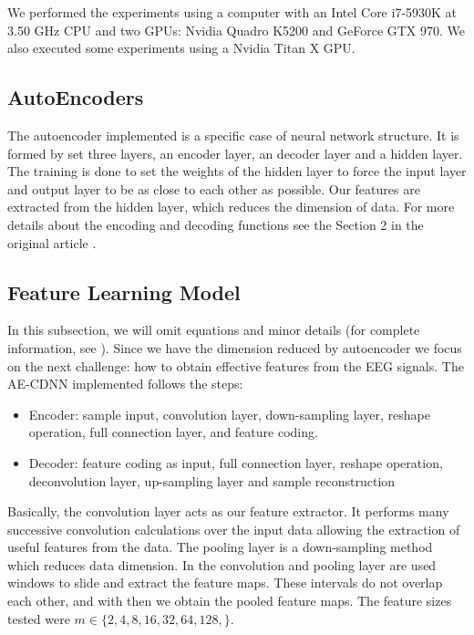 We performed the experiments using a computer with an Intel Core i7-5930K at 3.50 GHz CPU and two GPUs: Nvidia Quadro K5200 and GeForce GTX 970. We also executed some experiments using a Nvidia Titan X GPU.


\subsection{AutoEncoders}

The autoencoder implemented is a specific case of neural network structure. It is formed by set three layers, an encoder layer, an decoder layer and a hidden layer. The training is done to set the weights of the hidden layer to force the input layer and output layer to be as close to each other as possible. Our features are extracted from the hidden layer, which reduces the dimension of data. For more details about the encoding and decoding functions see the Section 2 in the original article \cite{WenZha:2018}.

\subsection{Feature Learning Model}

In this subsection, we will omit equations and minor details (for complete information, see \cite{Shoeb,emami2019autoencoding}). Since we have the dimension reduced by autoencoder we focus on the next challenge: how to obtain effective features from the EEG signals. The AE-CDNN implemented follows the steps:

\begin{itemize}
\item Encoder: sample input, convolution layer, down-sampling layer, reshape operation, full connection layer, and feature coding.
\item Decoder: feature coding as input, full 
connection layer, reshape operation, deconvolution layer, up-sampling layer and sample reconstruction
\end{itemize}

Basically, the convolution layer acts as our feature extractor. It performs many successive convolution calculations over the input data allowing the extraction of useful features from the data. The pooling layer is a down-sampling method which reduces data dimension. In the convolution and pooling layer are used windows to slide and extract the feature maps. These intervals do not overlap each other, and with then we obtain the pooled feature maps. The feature sizes tested were $m \in \{2, 4, 8, 16, 32, 64, 128, \}$.


